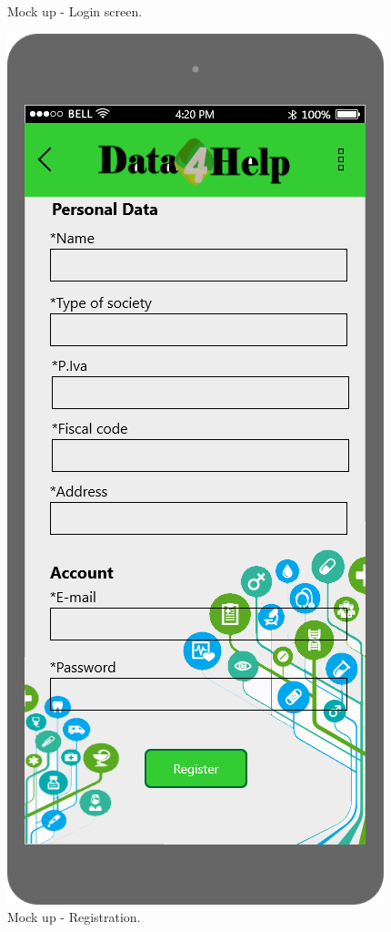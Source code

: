 \begin{figure}[h!]
\begin{minipage}[b]{0.25\textwidth}
    		\caption{Mock up - Login screen.}
  	\end{minipage}
	\hfill
 	\begin{minipage}[b]{0.25\textwidth}
    		\includegraphics[width=\textwidth]{./pictures/3p_registration.png}
    		\caption{Mock up - Registration.}
	\end{minipage}
\end{figure}
